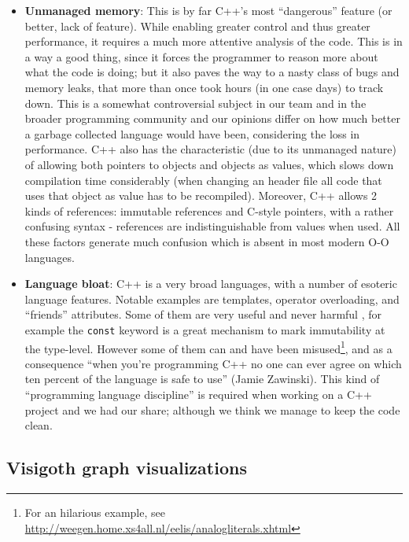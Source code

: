 \documentclass[a4paper,11pt,titlepage]{article}
\newcommand{\code}[1]{\texttt{#1}}
\begin{document}
\begin{itemize}

\item
  \textbf{Unmanaged memory}: This is by far C++'s most ``dangerous'' feature (or
  better, lack of feature). While enabling greater control and thus greater
  performance, it requires a much more attentive analysis of the code. This is
  in a way a good thing, since it forces the programmer to reason more about
  what the code is doing; but it also paves the way to a nasty class of bugs and
  memory leaks, that more than once took hours (in one case days) to track down.
  This is a somewhat controversial subject in our team and in the broader
  programming community and our opinions differ on how much better a garbage
  collected language would have been, considering the loss in performance. C++
  also has the characteristic (due to its unmanaged nature) of allowing both
  pointers to objects and objects as values, which slows down compilation time
  considerably (when changing an header file all code that uses that object as
  value has to be recompiled). Moreover, C++ allows 2 kinds of references:
  immutable references and C-style pointers, with a rather confusing syntax -
  references are indistinguishable from values when used. All these factors
  generate much confusion which is absent in most modern O-O languages.

\item
  \textbf{Language bloat}: C++ is a very broad languages, with a number of
  esoteric language features. Notable examples are templates, operator
  overloading, and ``friends'' attributes. Some of them are very useful and
  never harmful , for example the \code{const} keyword is a great mechanism to
  mark immutability at the type-level. However some of them can and have been
  misused\footnote{For an hilarious example, see
    \url{http://weegen.home.xs4all.nl/eelis/analogliterals.xhtml}}, and as a
  consequence ``when you're programming C++ no one can ever agree on which ten
  percent of the language is safe to use'' (Jamie Zawinski). This kind of
  ``programming language discipline'' is required when working on a C++ project
  and we had our share; although we think we manage to keep the code clean.

\end{itemize}

\subsection{Visigoth graph visualizations}
\end{document}
